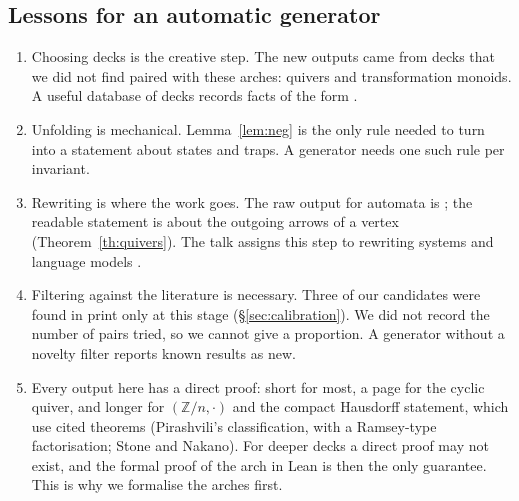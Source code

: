 \subsection{Lessons for an automatic generator}

\begin{enumerate}
\item Choosing decks is the creative step. The new outputs came from decks that we did not find paired with these arches: quivers and transformation monoids. A useful database of decks records facts of the form .
\item Unfolding is mechanical. Lemma~\ref{lem:neg} is the only rule needed to turn  into a statement about states and traps. A generator needs one such rule per invariant.
\item Rewriting is where the work goes. The raw output for automata is ; the readable statement is about the outgoing arrows of a vertex (Theorem~\ref{th:quivers}). The talk assigns this step to rewriting systems and language models \cite[slide 17]{caramello-mines}.
\item Filtering against the literature is necessary. Three of our candidates were found in print only at this stage (\S\ref{sec:calibration}). We did not record the number of pairs tried, so we cannot give a proportion. A generator without a novelty filter reports known results as new.
\item Every output here has a direct proof: short for most, a page for the cyclic quiver, and longer for $(\mathbb Z/n,\cdot)$ and the compact Hausdorff statement, which use cited theorems (Pirashvili's classification, with a Ramsey-type factorisation; Stone and Nakano). For deeper decks a direct proof may not exist, and the formal proof of the arch in Lean is then the only guarantee. This is why we formalise the arches first.
\end{enumerate}
